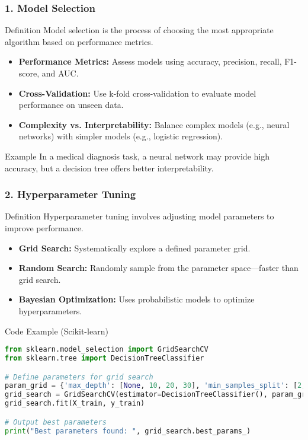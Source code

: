 \documentclass[aspectratio=169]{beamer}
\begin{document}
\begin{frame}[fragile]
    \frametitle{1. Model Selection}
    \begin{block}{Definition}
        Model selection is the process of choosing the most appropriate algorithm based on performance metrics.
    \end{block}
    
    \begin{itemize}
        \item \textbf{Performance Metrics:} Assess models using accuracy, precision, recall, F1-score, and AUC.
        \item \textbf{Cross-Validation:} Use k-fold cross-validation to evaluate model performance on unseen data.
        \item \textbf{Complexity vs. Interpretability:} Balance complex models (e.g., neural networks) with simpler models (e.g., logistic regression).
    \end{itemize}
    
    \begin{block}{Example}
        In a medical diagnosis task, a neural network may provide high accuracy, but a decision tree offers better interpretability.
    \end{block}
\end{frame}

\begin{frame}[fragile]
    \frametitle{2. Hyperparameter Tuning}
    \begin{block}{Definition}
        Hyperparameter tuning involves adjusting model parameters to improve performance.
    \end{block}
    
    \begin{itemize}
        \item \textbf{Grid Search:} Systematically explore a defined parameter grid.
        \item \textbf{Random Search:} Randomly sample from the parameter space—faster than grid search.
        \item \textbf{Bayesian Optimization:} Uses probabilistic models to optimize hyperparameters.
    \end{itemize}
    
    \begin{block}{Code Example (Scikit-learn)}
        \begin{lstlisting}[language=Python]
from sklearn.model_selection import GridSearchCV
from sklearn.tree import DecisionTreeClassifier

# Define parameters for grid search
param_grid = {'max_depth': [None, 10, 20, 30], 'min_samples_split': [2, 5, 10]}
grid_search = GridSearchCV(estimator=DecisionTreeClassifier(), param_grid=param_grid, cv=5)
grid_search.fit(X_train, y_train)

# Output best parameters
print("Best parameters found: ", grid_search.best_params_)
        \end{lstlisting}
    \end{block}
\end{frame}
\end{document}
